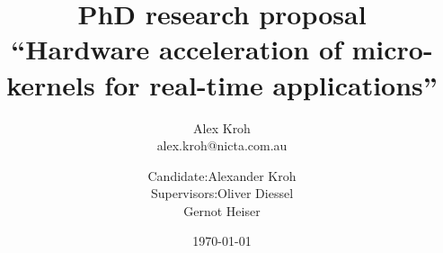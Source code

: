 

\title{PhD research proposal\\ ``Hardware acceleration of micro-kernels for real-time applications''}
\author{Alex Kroh \\ alex.kroh@nicta.com.au}

\author{\begin{tabular}{r@{ }l} 
Candidate:      & Alexander Kroh \\[1ex] 
Supervisors: & Oliver Diessel \\
             & Gernot Heiser
\end{tabular}}
\date{\today}

\documentclass[10pt]{article}

\addtolength{\textheight}{4cm}
\addtolength{\topmargin}{-2cm}


\maketitle




Safety critical embedded systems, such as automotive air bag and braking systems, require a thorough
analysis of Worst Case Execution Time (WCET) to ensure adherence to strict timing requirements.
Performance enhancement features of modern CPUs and cache warmth lead to non-determinism in execution
time and result in a pessimistic estimate for WCET. The system engineer must over provision processing
resources to ensure that, in the unlikely event that the WCET is ever observed, the system will still
have sufficient processing resources to meet timing requirements and operate in a safe manner. For
this reason, processing resources are typically dramatically underutilised in safety critical embedded
systems.

